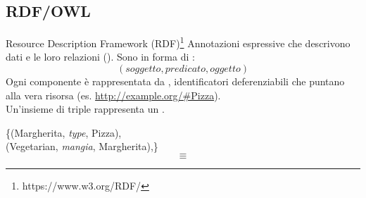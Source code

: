 \subsection{RDF/OWL}
\begin{frame}{Resource Description Framework (RDF)\footnote{https://www.w3.org/RDF/}}	
	Annotazioni espressive che descrivono dati e le loro relazioni (\textit{}). Sono in forma di :
	\[ ( \textit{soggetto}, \textit{predicato}, \textit{oggetto})\]
	Ogni componente è rappresentata da , identificatori deferenziabili che puntano alla vera risorsa (es. \url{http://example.org/\#Pizza}).\\
	Un'insieme di triple rappresenta un .

	\begin{center}
		\{(Margherita, \textit{type}, Pizza),\\
		(Vegetarian, \textit{mangia}, Margherita),\}
		\[\equiv\]
		
	\end{center}
	
\end{frame}
